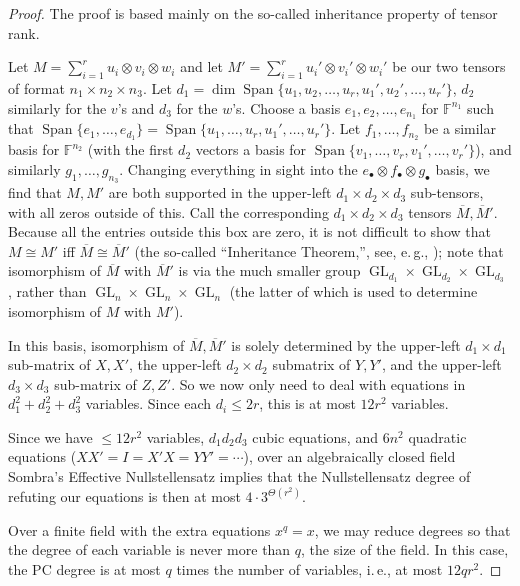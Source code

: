 \documentclass[10pt,a4paper]{article}
\theoremstyle{definition}
\DeclareMathOperator{\GL}{GL}
\DeclareMathOperator{\Span}{Span}
\newcommand{\F}{\mathbb{F}}
\begin{document}
\begin{proof}
The proof is based mainly on the so-called inheritance property of tensor rank.

Let $M = \sum_{i=1}^r u_i \otimes v_i \otimes w_i$ and let $M' = \sum_{i=1}^r u_i' \otimes v_i' \otimes w_i'$ be our two tensors of format $n_1 \times n_2 \times n_3$. Let $d_1 = \dim \Span\{u_1, u_2, \dotsc, u_r, u_1', u_2', \dotsc, u_r'\}$, $d_2$ similarly for the $v$'s and $d_3$ for the $w$'s. Choose a basis $e_1, e_2, \dotsc, e_{n_1}$ for $\F^{n_1}$ such that $\Span\{e_1, \dotsc, e_{d_1}\} = \Span\{u_1, \dotsc, u_r, u_1', \dotsc, u_r'\}$. Let $f_1, \dotsc, f_{n_2}$ be a similar basis for $\F^{n_2}$ (with the first $d_2$ vectors a basis for $\Span\{v_1, \dotsc, v_r, v_1', \dotsc, v_r'\}$), and similarly $g_1, \dotsc, g_{n_3}$. Changing everything in sight into the $e_{\bullet} \otimes f_{\bullet} \otimes g_{\bullet}$ basis, we find that $M,M'$ are both supported in the upper-left $d_1 \times d_2 \times d_3$ sub-tensors, with all zeros outside of this. Call the corresponding $d_1 \times d_2 \times d_3$ tensors $\overline{M}, \overline{M}'$. Because all the entries outside this box are zero, it is not difficult to show that $M \cong M'$ iff $\overline{M} \cong \overline{M}'$ (the so-called ``Inheritance Theorem,'', see, e.\,g., \cite[\S 3.7.1]{landsbergBook}); note that isomorphism of $\overline{M}$ with $\overline{M}'$ is via the much smaller group $\GL_{d_1} \times \GL_{d_2} \times \GL_{d_3}$, rather than $\GL_n \times \GL_n \times \GL_n$ (the latter of which is used to determine isomorphism of $M$ with $M'$).

In this basis, isomorphism of $\overline{M}, \overline{M}'$ is solely determined by the upper-left $d_1 \times d_1$ sub-matrix of $X, X'$, the upper-left $d_2 \times d_2$ submatrix of $Y, Y'$, and the upper-left $d_3 \times d_3$ sub-matrix of $Z, Z'$. So we now only need to deal with equations in $d_1^2 + d_2^2 + d_3^2$ variables. Since each $d_i \leq 2r$, this is at most $12r^2$ variables.

Since we have $\leq 12r^2$ variables, $d_1 d_2 d_3$ cubic equations, and $6n^2$ quadratic equations ($XX' = I = X'X = YY' = \dotsb$), over an algebraically closed field Sombra's Effective Nullstellensatz \cite{sombra} implies that the Nullstellensatz degree of refuting our equations is then at most $4 \cdot 3^{\Theta(r^2)}$. 

Over a finite field with the extra equations $x^q = x$, we may reduce degrees so that the degree of each variable is never more than $q$, the size of the field. In this case, the PC degree is at most $q$ times the number of variables, i.\,e., at most $12 q r^2$.
\end{proof}
\end{document}
